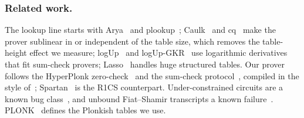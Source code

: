 \subsubsection{Related work.}
The lookup line starts with Arya~\cite{BCGJM18} and plookup~\cite{GW20}; Caulk~\cite{ZBKMNS22} and cq~\cite{EFG22}
make the prover sublinear in or independent of the table size, which removes the table-height effect we measure;
logUp~\cite{Hab22} and logUp-GKR~\cite{PH23} use logarithmic derivatives that fit sum-check provers; Lasso~\cite{STW24}
handles huge structured tables. Our prover follows the HyperPlonk zero-check~\cite{CBBZ23} and the
sum-check protocol~\cite{LFKN92}, compiled in the style of~\cite{BCS16}; Spartan~\cite{Set20} is the R1CS
counterpart. Under-constrained circuits are a known bug class~\cite{WSCFPCDF23,PCWRVMCG23,CMS23}, and unbound
Fiat--Shamir transcripts a known failure~\cite{BPW12}. PLONK~\cite{GWC19} defines the Plonkish tables we use.

